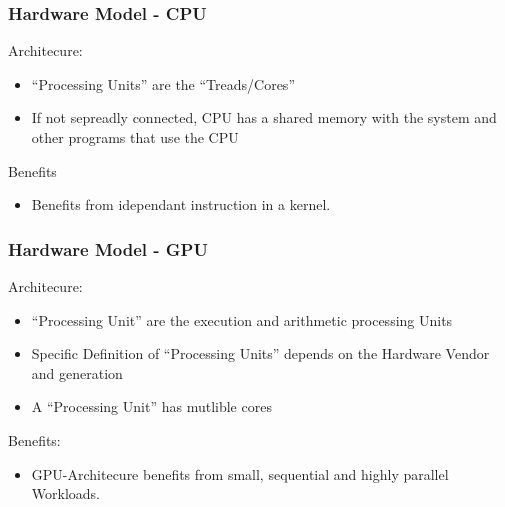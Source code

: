 \documentclass{beamer}
\begin{document}
\begin{frame}
    \frametitle{Hardware Model - CPU}
    Architecure:
    \begin{itemize}
        \item ``Processing Units'' are the ``Treads/Cores''
        \item If not sepreadly connected, CPU has a shared memory with the system and other programs that use the CPU
    \end{itemize}
    Benefits
    \begin{itemize}
        \item Benefits from idependant instruction in a kernel.
    \end{itemize}

\end{frame}
\begin{frame}
    \frametitle{Hardware Model - GPU}
    Architecure:
    \begin{itemize}
     \item ``Processing Unit'' are the execution and arithmetic processing Units
     \item Specific Definition of ``Processing Units'' depends on the Hardware Vendor and generation
     \item A ``Processing Unit'' has mutlible cores
    \end{itemize}
    Benefits:
    \begin{itemize}
     \item GPU-Architecure benefits from small, sequential and highly parallel Workloads.
    \end{itemize}
\end{frame}
\end{document}
